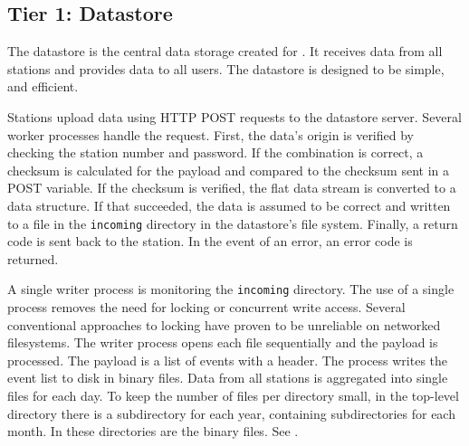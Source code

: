 \subsection{Tier 1: Datastore}

The datastore is the central data storage created for \hisparc. It
receives data from all stations and provides data to all users.  The datastore
is designed to be simple, and efficient.

Stations upload data using HTTP POST requests to the datastore server.  Several
worker processes handle the request.  First, the data's origin is verified by
checking the station number and password.  If the combination is correct, a
checksum is calculated for the payload and compared to the checksum sent in a
POST variable.  If the checksum is verified, the flat data stream is converted
to a data structure.
If that succeeded, the data is assumed to be correct and written to a file in the
\verb|incoming| directory in the datastore's file system.  Finally, a return code
is sent back to the station.  In the event of an error, an error code is
returned.

A single writer process is monitoring the \verb|incoming| directory.  The use of
a single process removes the need for locking or concurrent write access.
Several conventional approaches to locking have proven to be unreliable on
networked filesystems. The writer process opens each file sequentially and the
payload is processed.
The payload is a list of events with a header.  The process writes the event
list to disk in binary files.  Data from all stations is aggregated into single
files for each day.  To keep the number of files per directory small, in the
top-level directory there is a subdirectory for each year, containing
subdirectories for each month.  In these directories are the binary files.  See
.

